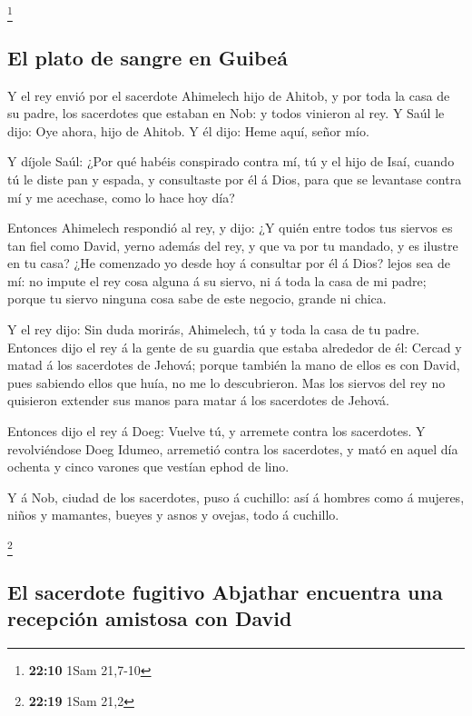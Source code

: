 \footnote{\textbf{22:10} 1Sam 21,7-10}

\hypertarget{el-plato-de-sangre-en-guibeuxe1}{%
\subsection{El plato de sangre en
Guibeá}\label{el-plato-de-sangre-en-guibeuxe1}}

 Y el rey envió por el sacerdote Ahimelech hijo de Ahitob,
y por toda la casa de su padre, los sacerdotes que estaban en Nob: y
todos vinieron al rey.  Y Saúl le dijo: Oye ahora, hijo de
Ahitob. Y él dijo: Heme aquí, señor mío.

 Y díjole Saúl: ¿Por qué habéis conspirado contra mí, tú y
el hijo de Isaí, cuando tú le diste pan y espada, y consultaste por él á
Dios, para que se levantase contra mí y me acechase, como lo hace hoy
día?

 Entonces Ahimelech respondió al rey, y dijo: ¿Y quién
entre todos tus siervos es tan fiel como David, yerno además del rey, y
que va por tu mandado, y es ilustre en tu casa?  ¿He
comenzado yo desde hoy á consultar por él á Dios? lejos sea de mí: no
impute el rey cosa alguna á su siervo, ni á toda la casa de mi padre;
porque tu siervo ninguna cosa sabe de este negocio, grande ni chica.

 Y el rey dijo: Sin duda morirás, Ahimelech, tú y toda la
casa de tu padre.  Entonces dijo el rey á la gente de su
guardia que estaba alrededor de él: Cercad y matad á los sacerdotes de
Jehová; porque también la mano de ellos es con David, pues sabiendo
ellos que huía, no me lo descubrieron. Mas los siervos del rey no
quisieron extender sus manos para matar á los sacerdotes de Jehová.

 Entonces dijo el rey á Doeg: Vuelve tú, y arremete contra
los sacerdotes. Y revolviéndose Doeg Idumeo, arremetió contra los
sacerdotes, y mató en aquel día ochenta y cinco varones que vestían
ephod de lino.

 Y á Nob, ciudad de los sacerdotes, puso á cuchillo: así á
hombres como á mujeres, niños y mamantes, bueyes y asnos y ovejas, todo
á cuchillo.

\footnote{\textbf{22:19} 1Sam 21,2}

\hypertarget{el-sacerdote-fugitivo-abjathar-encuentra-una-recepciuxf3n-amistosa-con-david}{%
\subsection{El sacerdote fugitivo Abjathar encuentra una recepción
amistosa con
David}\label{el-sacerdote-fugitivo-abjathar-encuentra-una-recepciuxf3n-amistosa-con-david}}


